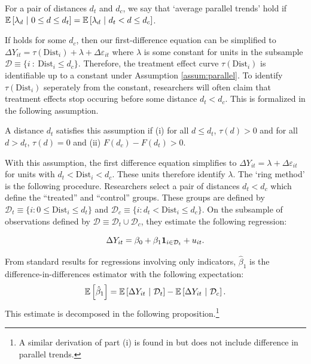 \documentclass[12pt]{article}
\newcommand{\dist}{\text{Dist}}
\begin{document}
\begin{assumption}\label{assum:parallel_weak}
    For a pair of distances $d_t$ and $d_c$, we say that `average parallel trends' hold if $\mathbb{E}\left[\lambda_d \ \vert \ 0 \leq d \leq d_t\right] = \mathbb{E}\left[\lambda_d \ \vert \ d_t < d \leq d_c\right]$.
\end{assumption}

If  holds for some $d_c$, then our first-difference equation can be simplified to $\Delta Y_{it} = \tau(\dist_i) + \lambda + \Delta \varepsilon_{it}$ where $\lambda$ is some constant for units in the subsample $\mathcal{D} \equiv \{i \ : \ \dist_i \leq d_c \} $. Therefore, the treatment effect curve $\tau(\dist_i)$ is identifiable up to a constant under Assumption \ref{assum:parallel}. To identify $\tau(\dist_i)$ seperately from the constant, researchers will often claim that treatment effects stop occuring before some distance $d_t < d_c$. This is formalized in  the following assumption. 

\begin{assumption}[Correct $d_t$]\label{assum:dt}
    A distance $d_t$ satisfies this assumption if (i) for all $d \leq d_t$, $\tau(d) > 0$ and for all $d > d_t$, $\tau(d) = 0$ and (ii) $F(d_c) - F(d_t) > 0$.
\end{assumption}

With this assumption, the first difference equation simplifies to $\Delta Y_{it} = \lambda + \Delta \varepsilon_{it}$ for units with $d_t < \dist_i < d_c$. These units therefore identify $\lambda$. The `ring method' is the following procedure. Researchers select a pair of distances $d_t < d_c$ which define the ``treated'' and ``control'' groups. These groups are defined by $\mathcal{D}_t \equiv \{ i : 0 \leq \dist_i \leq d_t \}$ and $\mathcal{D}_c \equiv \{ i : d_t < \dist_i \leq d_c \}$. On the subsample of observations defined by $\mathcal{D} \equiv \mathcal{D}_t \cup \mathcal{D}_c$, they estimate the following regression:

\begin{equation}\label{eq:ring_method}
    \Delta Y_{it} = \beta_0 + \beta_1 \mathbf{1}_{i \in \mathcal{D}_t} + u_{it}.
\end{equation}

From standard results for regressions involving only indicators, $\hat{\beta}_1$ is the difference-in-differences estimator with the following expectation:
\[
    \mathbb{E}\left[\hat{\beta}_1\right] = \mathbb{E}\left[\Delta Y_{it} \ \vert \ \mathcal{D}_t\right] - \mathbb{E}\left[\Delta Y_{it} \ \vert \ \mathcal{D}_c\right].
\]
This estimate is decomposed in the following proposition.\footnote{A similar derivation of part (i) is found in \citet{Sullivan_2017} but does not include difference in parallel trends.}
\end{document}
